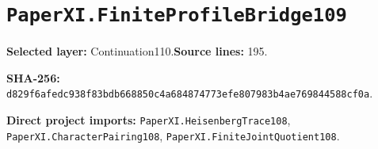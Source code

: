 \documentclass[10pt,oneside]{book}
\begin{document}
\section{\texorpdfstring{\nolinkurl{PaperXI.FiniteProfileBridge109}}{PaperXI.FiniteProfileBridge109}}\label{module:PaperXI.FiniteProfileBridge109}

\textbf{Selected layer:} Continuation110.\quad\textbf{Source lines:} 195.\par\textbf{SHA-256:} {\scriptsize\nolinkurl{d829f6afedc938f83bdb668850c4a684874773efe807983b4ae769844588cf0a}}.


\textbf{Direct project imports:} \nolinkurl{PaperXI.HeisenbergTrace108}, \nolinkurl{PaperXI.CharacterPairing108}, \nolinkurl{PaperXI.FiniteJointQuotient108}.
\end{document}

